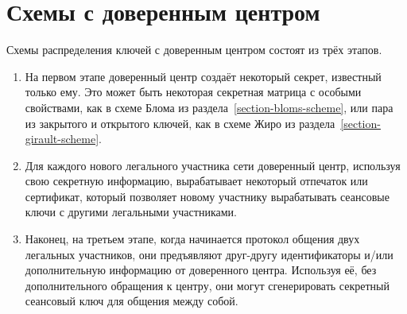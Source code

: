 \section{Схемы с доверенным центром}\label{key-distribution-schemas}

Схемы распределения ключей с доверенным центром состоят из трёх этапов.

\begin{enumerate}
    \item На первом этапе доверенный центр создаёт некоторый секрет, известный только ему. Это может быть некоторая секретная матрица с особыми свойствами, как в схеме Блома из раздела~\ref{section-bloms-scheme}, или пара из закрытого и открытого ключей, как в схеме Жиро из раздела~\ref{section-girault-scheme}.
    \item Для каждого нового легального участника сети доверенный центр, используя свою секретную информацию, вырабатывает некоторый отпечаток или сертификат, который позволяет новому участнику вырабатывать сеансовые ключи с другими легальными участниками.
    \item Наконец, на третьем этапе, когда начинается протокол общения двух легальных участников, они предъявляют друг-другу идентификаторы и/или дополнительную информацию от доверенного центра. Используя её, без дополнительного обращения к центру, они могут сгенерировать секретный сеансовый ключ для общения между собой.
\end{enumerate}





